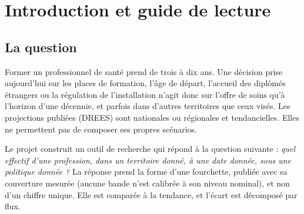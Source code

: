 \section{Introduction et guide de lecture}\label{int:intro}

\subsection{La question}
Former un professionnel de santé prend de trois à dix ans. Une décision prise aujourd'hui sur les places de
formation, l'âge de départ, l'accueil des diplômés étrangers ou la régulation de l'installation n'agit donc sur
l'offre de soins qu'à l'horizon d'une décennie, et parfois dans d'autres territoires que ceux visés. Les projections
publiées (DREES) sont nationales ou régionales et tendancielles. Elles ne permettent pas de composer ses propres
scénarios.

Le projet construit un outil de recherche qui répond à la question suivante : \emph{quel effectif d'une profession,
dans un territoire donné, à une date donnée, sous une politique donnée ?} La réponse prend la forme d'une
fourchette, publiée avec sa couverture mesurée (aucune bande n'est calibrée à son niveau nominal), et non d'un
chiffre unique. Elle est comparée à la tendance, et l'écart est décomposé par flux.

